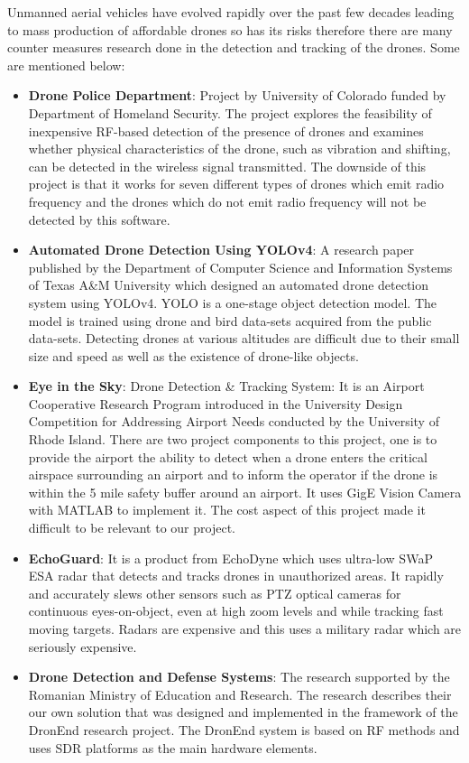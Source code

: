Unmanned aerial vehicles have evolved rapidly over the past few decades leading to mass production of affordable drones so has its risks therefore there are many counter measures research done in the detection and tracking of the drones. Some are mentioned below: 
\begin{itemize}
  \item  \textbf{Drone Police Department}\cite{Nguyen2017}: Project by University of Colorado funded by Department of Homeland Security. The project explores the feasibility of inexpensive RF-based detection of the presence of drones and examines whether physical characteristics of the drone, such as vibration and shifting, can be detected in the wireless signal transmitted. The downside of this project is that it works for seven different types of drones which emit radio frequency and the drones which do not emit radio frequency will not be detected by this software.
  
  \item \textbf{Automated Drone Detection Using YOLOv4}\cite{Singha2021}: A research paper published by the Department of Computer Science and Information Systems of Texas A&M University which designed an automated drone detection system using YOLOv4. YOLO is a one-stage object detection model. The model is trained using drone and bird data-sets acquired from the public data-sets. Detecting drones at various altitudes are difficult due to their small size and speed as well as the existence of drone-like objects.
  \item \textbf{Eye in the Sky}\cite{Pratt2015}:  Drone Detection & Tracking System:  It is an Airport Cooperative Research Program introduced in the University Design Competition for Addressing Airport Needs conducted by the University of Rhode Island. There are two project components to this project, one is to provide the airport the ability to detect when a drone enters the critical airspace surrounding an airport and to inform the operator if the drone is within the 5 mile safety buffer around an airport.  It uses GigE Vision Camera with MATLAB to implement it. The cost aspect of this project made it difficult to be relevant to our project.
  \item \textbf{EchoGuard}\cite{EchoGuard}:  It is a product from EchoDyne which uses ultra-low SWaP ESA radar that detects and tracks drones in unauthorized areas. It rapidly and accurately slews other sensors such as PTZ optical cameras for continuous eyes-on-object, even at high zoom levels and while tracking fast moving targets. Radars are expensive and this uses a military radar which are seriously expensive.
  \item \textbf{Drone Detection and Defense Systems}\cite{DroneDetectionChiper}: The research supported by the Romanian Ministry of Education and Research. The research describes their our own solution that was designed and implemented in the framework of the DronEnd research project. The DronEnd system is based on RF methods and uses SDR platforms as the main hardware elements. 
\end{itemize}
